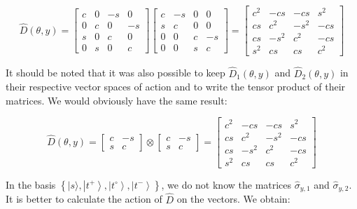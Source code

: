 \documentclass{article}
\begin{document}
\begin{enumerate}
\begin{enumerate}
{            \[
            \hat{D}(\theta, y) = \left[\begin{array}{cccc}
            c & 0 & -s & 0 \\
            0 & c & 0 & -s \\
            s & 0 & c & 0 \\
            0 & s & 0 & c
            \end{array}\right] \left[\begin{array}{cccc}
            c & -s & 0 & 0 \\
            s & c & 0 & 0 \\
            0 & 0 & c & -s \\
            0 & 0 & s & c
            \end{array}\right] = \left[\begin{array}{cccc}
            c^{2} & -c s & -c s & s^{2} \\
            c s & c^{2} & -s^{2} & -c s \\
            c s & -s^{2} & c^{2} & -c s \\
            s^{2} & c s & c s & c^{2}
            \end{array}\right]
            \]

            It should be noted that it was also possible to keep \(\hat{D}_{1}(\theta, y)\) and \(\hat{D}_{2}(\theta, y)\) in their respective vector spaces of action and to write the tensor product of their matrices. We would obviously have the same result:

            \[
            \hat{D}(\theta, y) = \left[\begin{array}{cc}
            c & -s \\
            s & c
            \end{array}\right] \otimes \left[\begin{array}{cc}
            c & -s \\
            s & c
            \end{array}\right] = \left[\begin{array}{cccc}
            c^{2} & -c s & -c s & s^{2} \\
            c s & c^{2} & -s^{2} & -c s \\
            c s & -s^{2} & c^{2} & -c s \\
            s^{2} & c s & c s & c^{2}
            \end{array}\right]
            \]

            In the basis \(\left\{|s\rangle, \left|t^{+}\right\rangle, \left|t^{\circ}\right\rangle, \left|t^{-}\right\rangle\right\}\), we do not know the matrices \(\hat{\sigma}_{y, 1}\) and \(\hat{\sigma}_{y, 2}\). It is better to calculate the action of \(\hat{D}\) on the vectors. We obtain:

}
\end{enumerate}
\end{enumerate}
\end{document}
